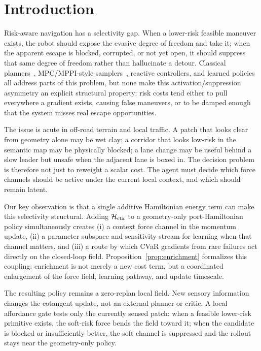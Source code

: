 \section{Introduction}
\label{sec:intro}

Risk-aware navigation has a selectivity gap. When a lower-risk feasible
maneuver exists, the robot should expose the evasive degree of freedom and
take it; when the apparent escape is blocked, corrupted, or not yet open, it
should suppress that same degree of freedom rather than hallucinate a detour.
Classical planners~\citep{hart1968formal,karaman2011sampling},
MPC/MPPI-style samplers~\citep{williams2017mppi}, reactive controllers, and
learned policies~\citep{schulman2017proximalpolicyoptimizationalgorithms,haarnoja2018softactorcriticoffpolicymaximum}
all address parts of this problem, but none make this
activation/suppression asymmetry an explicit structural property: risk costs
tend either to pull everywhere a gradient exists, causing false maneuvers, or
to be damped enough that the system misses real escape opportunities.

The issue is acute in off-road terrain and local traffic. A patch that looks
clear from geometry alone may be wet clay; a corridor that looks low-risk in
the semantic map may be physically blocked; a lane change may be useful behind
a slow leader but unsafe when the adjacent lane is boxed in. The decision
problem is therefore not just to reweight a scalar cost. The agent must decide
which force channels should be active under the current local context, and
which should remain latent.

Our key observation is that a single additive Hamiltonian energy term can make
this selectivity structural. Adding $\mathcal{H}_{\rm ctx}$ to a geometry-only
port-Hamiltonian policy simultaneously creates (i) a context force channel
in the momentum update, (ii) a parameter subspace and sensitivity stream for
learning when that channel matters, and (iii) a route by which CVaR gradients
from rare failures act directly on the closed-loop field.
Proposition~\ref{prop:enrichment} formalizes this coupling: enrichment is not merely a
new cost term, but a coordinated enlargement of the force field, learning
pathway, and update timescale.

The resulting policy remains a zero-replan local field. New sensory
information changes the cotangent update, not an external planner or critic.
A local affordance gate tests only the currently sensed patch: when a feasible
lower-risk primitive exists, the soft-risk force bends the field toward it;
when the candidate is blocked or insufficiently better, the soft channel is
suppressed and the rollout stays near the geometry-only policy.

